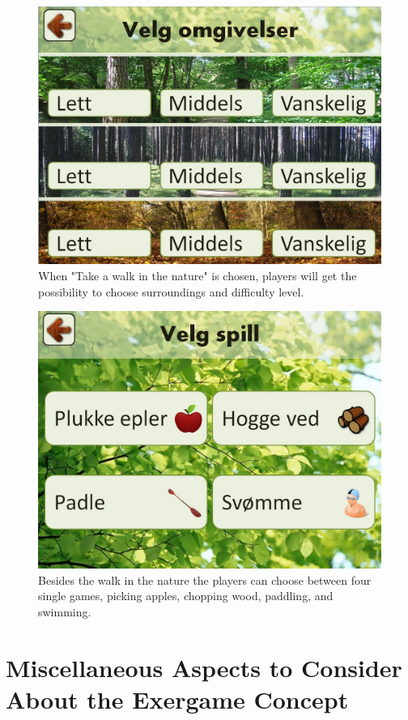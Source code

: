 \begin{figure} [ht!]
\centering
\includegraphics[scale=0.45]{VelgOmgivelser.jpg}
\caption[Choice of surroundings and difficulty]{When "Take a walk in the nature" is chosen, players will get the possibility to choose surroundings and difficulty level.}
\label{fig:omgivelseNivaa}
\end{figure}

\begin{figure} [ht!]
\centering
\includegraphics[scale=0.4]{VelgSpill.jpg}
\caption[The four single games]{Besides the walk in the nature the players can choose between four single games, picking apples, chopping wood, paddling, and swimming.}
\label{fig:velgSpill}
\end{figure}



\section{Miscellaneous Aspects to Consider About the Exergame Concept}
\label{sec:misc}